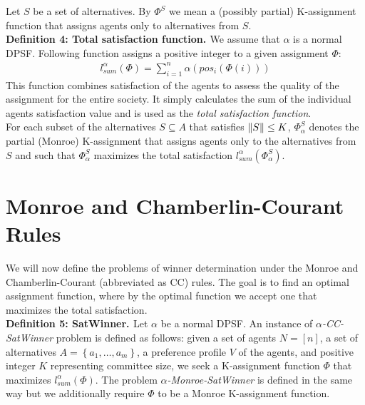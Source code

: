 Let $S$ be a set of alternatives. By $\Phi^{S}$ we mean a (possibly partial) K-assignment function that assigns agents only to alternatives from $S$.
\\

\noindent
\textbf{Definition 4: Total satisfaction function. \cite{1}} \hspace{.1in} We assume that $\alpha$ is a normal DPSF. Following function assigns a positive integer to a given assignment $\Phi$:
\begin{gather}
	l^{\alpha}_{sum}(\Phi) = \sum^{n}_{i=1} \alpha (pos_{i}(\Phi(i)))
\end{gather}
This function combines satisfaction of the agents to assess the quality of the assignment for the entire society. It simply calculates the sum of the individual agents satisfaction value and is used as the \textit{total satisfaction function}.
\\

For each subset of the alternatives $S \subseteq A$ that satisfies $\lVert S\rVert \leq K$, $\Phi^{S}_{\alpha}$ denotes the partial (Monroe) K-assignment that assigns agents only to the alternatives from $S$ and such that $\Phi^{S}_{\alpha}$ maximizes the total satisfaction $l^{\alpha}_{sum}(\Phi^{S}_{\alpha})$.

\section{Monroe and Chamberlin-Courant Rules}

We will now define the problems of winner determination under the Monroe and Chamberlin-Courant (abbreviated as CC) rules. The goal is to find an optimal assignment function, where by the optimal function we accept one that maximizes the total satisfaction.
\\

\noindent
\textbf{Definition 5: SatWinner. \cite{1}} \hspace{.1in} Let $\alpha$ be a normal DPSF. An instance of $\alpha$\textit{-CC-SatWinner} problem is defined as follows: given a set of agents $N = [n]$, a set of alternatives $A = \left\{ a_{1}, \ldots, a_{m} \right\}$, a preference profile $V$ of the agents, and positive integer $K$ representing committee size, we seek a K-assignment function $\Phi$ that maximizes $l^{\alpha}_{sum}(\Phi)$. The problem $\alpha$\textit{-Monroe-SatWinner} is defined in the same way but we additionally require $\Phi$ to be a Monroe K-assignment function.
\\

